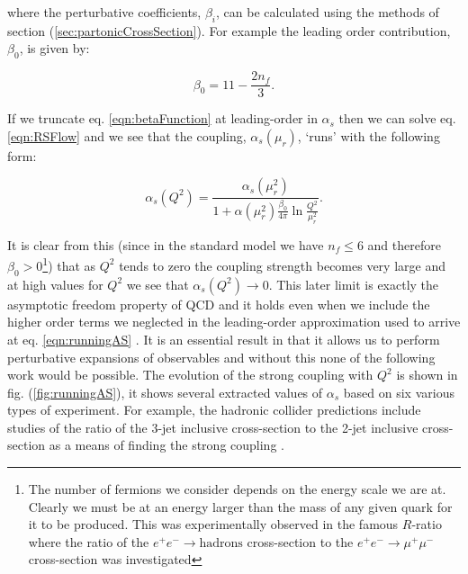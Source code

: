 	where the perturbative coefficients, $\beta_i$, can be calculated using the methods of section (\ref{sec:partonicCrossSection}).
	For example the leading order contribution, $\beta_0$, is given by:

	\begin{equation}
		\beta_0 = 11 - \frac{2n_f}{3}.
	\end{equation}

	If we truncate eq. \eqref{eqn:betaFunction} at leading-order in $\alpha_s$ then we can solve eq. \eqref{eqn:RSFlow}
	and we see that the coupling, $\alpha_s(\mu_r)$, `runs' with the following form:

	\begin{equation}
		\alpha_s(Q^2) = \frac{\alpha_s(\mu_r^2)}{1 + \alpha(\mu_r^2)\frac{\beta_0}{4\pi}\ln\frac{Q^2}{\mu_r^2}}.
		\label{eqn:runningAS}
	\end{equation}

	It is clear from this (since in the standard model we have $n_f\leq6$ and therefore $\beta_0>0$\footnote{The number of
	fermions we consider depends on the energy scale we are at. Clearly we must be at an energy larger than the mass of any
	given quark for it to be produced.  This was experimentally observed in the famous $R$-ratio where the ratio of the
	$e^+e^-\rightarrow \text{hadrons}$ cross-section to the $e^+e^-\rightarrow\mu^+\mu^-$ cross-section was investigated})
	that as $Q^2$ tends to zero the coupling strength becomes very large and at high values for $Q^2$ we see that $\alpha_s(Q^2)\rightarrow0$.
	This later limit is exactly the asymptotic freedom property of QCD and it holds even when we include the higher order
	terms we neglected in the leading-order approximation used to arrive at eq. \eqref{eqn:runningAS} \cite{Beringer:1900zz}.
	It is an essential result in that it allows us to perform perturbative expansions of observables and without this none of the
	following work would be possible.  The evolution of the strong coupling with $Q^2$ is shown in fig. (\ref{fig:runningAS}),
	it shows several extracted values of $\alpha_s$ based on six various types of experiment.  For example, the hadronic
	collider predictions include studies of the ratio of the 3-jet inclusive cross-section to the 2-jet inclusive
	cross-section as a means of finding the strong coupling \cite{Chatrchyan:2013txa}.

